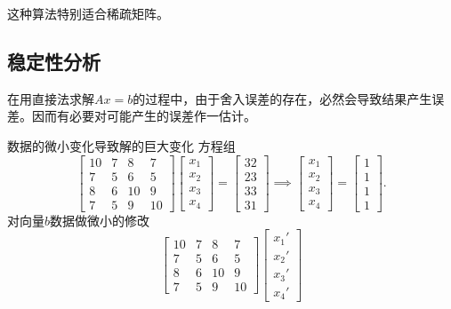 \begin{remark}
    这种算法特别适合稀疏矩阵。
\end{remark}

\subsection{稳定性分析}
\label{sec:stability analysis}

在用直接法求解$Ax = b$的过程中，由于舍入误差的存在，必然会导致结果产生误差。因而有必要对可能产生的误差作一估计。
\begin{example}
    {数据的微小变化导致解的巨大变化}{}
    方程组
    \[
        \begin{bmatrix}
            10&7&8&7\\
            7&5&6&5\\
            8&6&10&9\\
            7&5&9&10
        \end{bmatrix}\begin{bmatrix}
            x_1\\x_2\\x_3\\x_4
        \end{bmatrix} = \begin{bmatrix}
            32\\23\\33\\31
        \end{bmatrix} \implies \begin{bmatrix}
            x_1\\x_2\\x_3\\x_4
        \end{bmatrix} = \begin{bmatrix}
            1\\1\\1\\1
        \end{bmatrix}.
    \]
    对向量$b$数据做微小的修改
    \[
        \begin{bmatrix}
            10&7&8&7\\
            7&5&6&5\\
            8&6&10&9\\
            7&5&9&10
        \end{bmatrix}\begin{bmatrix}
            x_1'\\x_2'\\x_3'\\x_4'

\end{bmatrix}\]
\end{example}
